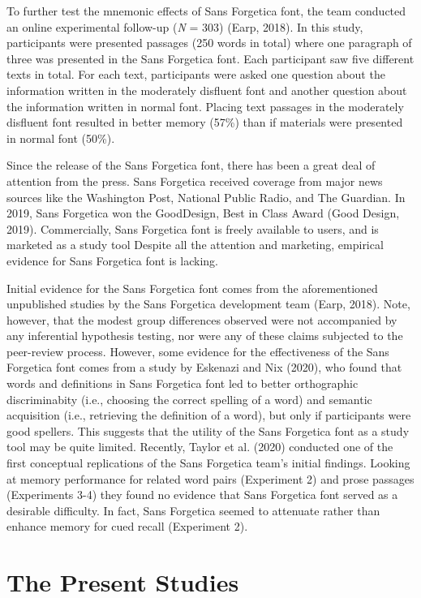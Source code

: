 \documentclass[jou]{apa6}
\begin{document}
To further test the mnemonic effects of Sans Forgetica font, the team conducted an online experimental follow-up (\emph{N} = 303) (Earp, 2018). In this study, participants were presented passages (250 words in total) where one paragraph of three was presented in the Sans Forgetica font. Each participant saw five different texts in total. For each text, participants were asked one question about the information written in the moderately disfluent font and another question about the information written in normal font. Placing text passages in the moderately disfluent font resulted in better memory (57\%) than if materials were presented in normal font (50\%).

Since the release of the Sans Forgetica font, there has been a great deal of attention from the press. Sans Forgetica received coverage from major news sources like the Washington Post, National Public Radio, and The Guardian. In 2019, Sans Forgetica won the GoodDesign, Best in Class Award (Good Design, 2019). Commercially, Sans Forgetica font is freely available to users, and is marketed as a study tool Despite all the attention and marketing, empirical evidence for Sans Forgetica font is lacking.

Initial evidence for the Sans Forgetica font comes from the aforementioned unpublished studies by the Sans Forgetica development team (Earp, 2018). Note, however, that the modest group differences observed were not accompanied by any inferential hypothesis testing, nor were any of these claims subjected to the peer-review process. However, some evidence for the effectiveness of the Sans Forgetica font comes from a study by Eskenazi and Nix (2020), who found that words and definitions in Sans Forgetica font led to better orthographic discriminabity (i.e., choosing the correct spelling of a word) and semantic acquisition (i.e., retrieving the definition of a word), but only if participants were good spellers. This suggests that the utility of the Sans Forgetica font as a study tool may be quite limited. Recently, Taylor et al. (2020) conducted one of the first conceptual replications of the Sans Forgetica team's initial findings. Looking at memory performance for related word pairs (Experiment 2) and prose passages (Experiments 3-4) they found no evidence that Sans Forgetica font served as a desirable difficulty. In fact, Sans Forgetica seemed to attenuate rather than enhance memory for cued recall (Experiment 2).

\hypertarget{the-present-studies}{%
\section{The Present Studies}\label{the-present-studies}}
\end{document}
